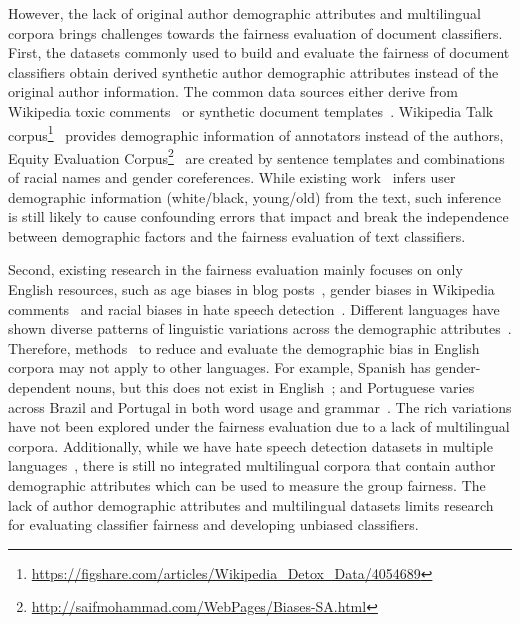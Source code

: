 However, the lack of original author demographic attributes and multilingual corpora brings challenges towards the fairness evaluation of document classifiers.
First, the datasets commonly used to build and evaluate the fairness of document classifiers obtain derived synthetic author demographic attributes instead of the original author information.
The common data sources either derive from Wikipedia toxic comments~\cite{dixon2018measuring, park2018reducing, garg2019counterfactual} or synthetic document templates~\cite{kiritchenko2018examining, park2018reducing, burke2018synthetic}.
Wikipedia Talk corpus\footnote{\url{https://figshare.com/articles/Wikipedia_Detox_Data/4054689}}~\cite{wulczyn2017ex} provides demographic information of annotators instead of the authors, Equity Evaluation Corpus\footnote{\url{http://saifmohammad.com/WebPages/Biases-SA.html}}~\cite{kiritchenko2018examining} are created by sentence templates and combinations of racial names and gender coreferences.
While existing work~\cite{davidson2019racial, diaz2018addressing} infers user demographic information (white/black, young/old) from the text, such inference is still likely to cause confounding errors that impact and break the independence between demographic factors and the fairness evaluation of text classifiers.

Second, existing research in the fairness evaluation mainly focuses on only English resources, such as age biases in blog posts~\cite{diaz2018addressing}, gender biases in Wikipedia comments~\cite{dixon2018measuring} and racial biases in hate speech detection~\cite{davidson2019racial}.
Different languages have shown diverse patterns of linguistic variations across the demographic attributes~\cite{johannsen2015cross, huang2019neural}.
Therefore, methods~\cite{zhao2017men, park2018reducing} to reduce and evaluate the demographic bias in English corpora may not apply to other languages. 
For example, Spanish has gender-dependent nouns, but this does not exist in English~\cite{sun2019mitigating}; and Portuguese varies across Brazil and Portugal in both word usage and grammar~\cite{maier2014language}.
The rich variations have not been explored under the fairness evaluation due to a lack of multilingual corpora.
Additionally, while we have hate speech detection datasets in multiple languages~\cite{waseem2016hateful, sanguinetti2018italian, ptaszynski2017learning, basile2019semeval, fortuna2019hierarchically}, there is still no integrated multilingual corpora that contain author demographic attributes which can be used to measure the group fairness.
The lack of author demographic attributes and multilingual datasets limits research for evaluating classifier fairness and developing unbiased classifiers.


